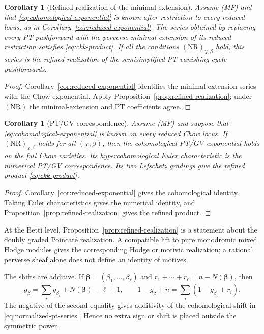 \documentclass[11pt,reqno]{amsart}
\newtheorem{corollary}[theorem]{Corollary}
\theoremstyle{definition}
\begin{document}
\begin{corollary}[Refined realization of the minimal extension]
\label{cor:minimal-refined-product}
Assume \emph{(MF)} and that \eqref{eq:cohomological-exponential} is known after restriction
to every reduced locus, as in Corollary~\ref{cor:reduced-exponential}.
The series obtained by replacing every PT pushforward with the perverse
minimal extension of its reduced restriction satisfies
\eqref{eq:ckk-product}.  If all the conditions
$(\mathrm{NR})_{\chi,\beta}$ hold, this series is the refined realization of
the semisimplified PT vanishing-cycle pushforwards.
\end{corollary}

\begin{proof}
Corollary~\ref{cor:reduced-exponential} identifies the minimal-extension
series with the Chow exponential.  Apply
Proposition~\ref{prop:refined-realization}; under $(\mathrm{NR})$ the
minimal-extension and PT coefficients agree.
\end{proof}

\begin{corollary}[PT/GV correspondence]
\label{cor:nr-ptgv}
Assume \emph{(MF)} and suppose that
\eqref{eq:cohomological-exponential} is known on every reduced Chow locus.
If $(\mathrm{NR})_{\chi,\beta}$ holds for all $(\chi,\beta)$, then the
cohomological PT/GV exponential holds on the full Chow varieties.  Its
hypercohomological Euler characteristic is the numerical PT/GV
correspondence.  Its two Lefschetz gradings give the refined product
\eqref{eq:ckk-product}.
\end{corollary}

\begin{proof}
Corollary~\ref{cor:reduced-exponential} gives the cohomological identity.
Taking Euler characteristics gives the numerical identity, and
Proposition~\ref{prop:refined-realization} gives the refined product.
\end{proof}

At the Betti level, Proposition~\ref{prop:refined-realization} is a statement
about the doubly graded Poincar\'e realization.  A compatible lift to pure
monodromic mixed Hodge modules gives the corresponding Hodge or motivic
realization; a rational perverse sheaf alone does not define an identity of
motives.

The shifts are additive.  If
$\boldsymbol\beta=(\beta_1,\ldots,\beta_\ell)$ and
$r_1+\cdots+r_\ell=n-N(\boldsymbol\beta)$, then
\begin{equation}\label{eq:genus-addition}
 g_\beta=\sum_i g_{\beta_i}+N(\boldsymbol\beta)-\ell+1,
 \qquad
 1-g_\beta+n=\sum_i(1-g_{\beta_i}+r_i).
\end{equation}
The negative of the second equality gives additivity of the cohomological
shift in \eqref{eq:normalized-pt-series}.  Hence no extra sign or shift is
placed outside the symmetric power.
\end{document}
